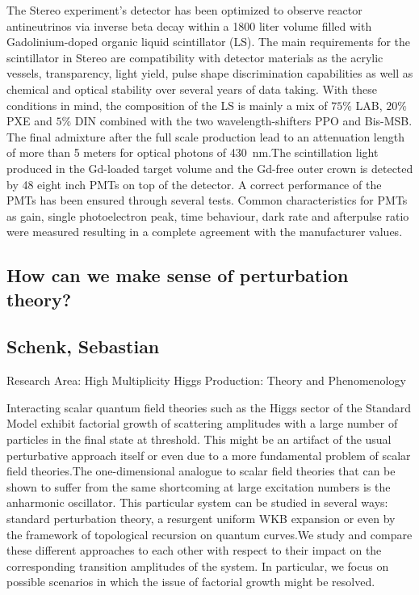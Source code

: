 \noindent The Stereo experiment's detector has been optimized to observe reactor antineutrinos via inverse beta decay within a 1800 liter volume filled with Gadolinium-doped organic liquid scintillator (LS). The main requirements for the scintillator in Stereo are compatibility with detector materials as the acrylic vessels, transparency, light yield, pulse shape discrimination capabilities as well as chemical and optical stability over several years of data taking. With these conditions in mind, the composition of the LS is mainly a mix of $75\%$ LAB, $20\%$PXE and $5\%$ DIN combined with the two wavelength-shifters PPO and Bis-MSB. The final admixture after the full scale production lead to an attenuation length of more than 5 meters for optical photons of 430~nm.\newline The scintillation light produced in the Gd-loaded target volume and the Gd-free outer crown is detected by 48 eight inch PMTs on top of the detector. A correct performance of the PMTs has been ensured through several tests. Common characteristics for PMTs as gain, single photoelectron peak, time behaviour, dark rate and afterpulse ratio were measured resulting in a complete agreement with the manufacturer values.
\newpage
\subsection*{\centering \large How can we make sense of perturbation theory?}
\subsection*{\centering \normalsize Schenk, Sebastian}
Research Area:  High Multiplicity Higgs Production: Theory and Phenomenology\newline

\noindent Interacting scalar quantum field theories such as the Higgs sector of the Standard Model exhibit factorial growth of scattering amplitudes with a large number of particles in the final state at threshold. This might be an artifact of the usual perturbative approach itself or even due to a more fundamental problem of scalar field theories.\newline The one-dimensional analogue to scalar field theories that can be shown to suffer from the same shortcoming at large excitation numbers is the anharmonic oscillator. This particular system can be studied in several ways: standard perturbation theory, a resurgent uniform WKB expansion or even by the framework of topological recursion on quantum curves.\newline We study and compare these different approaches to each other with respect to their impact on the corresponding transition amplitudes of the system. In particular, we focus on possible scenarios in which the issue of factorial growth might be resolved.

